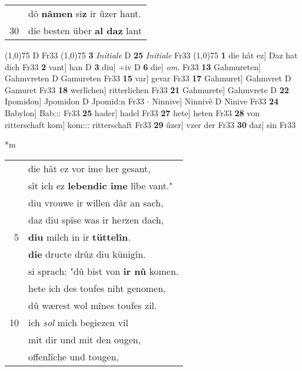\documentclass[8pt,a4paper,notitlepage]{article}
\begin{document}
\begin{table}[ht]
\begin{minipage}[t]{0.5\linewidth}
\begin{tabular}{rl}
 & dô \textbf{nâmen} si\textbf{z} ir ûzer hant.\\ 
30 & die besten über \textbf{al daz} lant\\ 
\end{tabular}
\scriptsize
\line(1,0){75} \newline
D Fr33 \newline
\line(1,0){75} \newline
\textbf{3} \textit{Initiale} D  \textbf{25} \textit{Initiale} Fr33  \newline
\line(1,0){75} \newline
\textbf{1} die hât ez] Daz hat dich Fr33 \textbf{2} vant] han D \textbf{3} diu] ÷iv D \textbf{6} die] \textit{om.} Fr33 \textbf{13} Gahmureten] Gahmvreten D Gamureten Fr33 \textbf{15} var] gevar Fr33 \textbf{17} Gahmuret] Gahmvret D Gamuret Fr33 \textbf{18} werlîchen] ritterlichen Fr33 \textbf{21} Gahmurete] Gahmvrete D \textbf{22} Ipomidon] Jpomidon D Jpomid:n Fr33  $\cdot$ Ninnive] Ninnivê D Ninive Fr33 \textbf{24} Babylon] Bab::: Fr33 \textbf{25} hader] hadel Fr33 \textbf{27} hete] heten Fr33 \textbf{28} von ritterschaft kom] kom::: ritterschaft Fr33 \textbf{29} ûzer] vzer der Fr33 \textbf{30} daz] sin Fr33 \newline
\end{minipage}
\hspace{0.5cm}
\begin{minipage}[t]{0.5\linewidth}
\small
\begin{center}*m
\end{center}
\begin{tabular}{rl}
 & die hât ez vor ime her gesant,\\ 
 & sît ich ez \textbf{lebendic ime} lîbe vant."\\ 
 & diu vrouwe ir willen dâr an sach,\\ 
 & daz diu spîse was ir he\textit{r}zen dach,\\ 
5 & \textbf{diu} milch in ir \textbf{tüttelîn}.\\ 
 & \textbf{die} dructe drûz diu künigîn.\\ 
 & si sprach: "dû bist von \textbf{ir nû} komen.\\ 
 & hete ich des toufes niht genomen,\\ 
 & dû wærest wol mînes toufes zil.\\ 
10 & ich \textit{sol} mich begiezen vil\\ 
 & mit dir und mit den ougen,\\ 
 & offenlîche und tougen,\\ 

\end{tabular}
\end{minipage}
\end{table}
\end{document}

